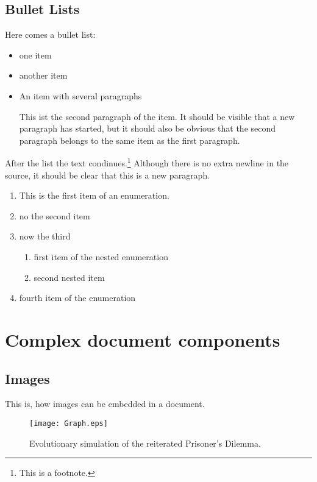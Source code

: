 \documentclass[12pt, english, a4paper]{article}
\begin{document}
\subsection{Bullet Lists}

Here comes a bullet list:
\begin{itemize}
\item one item
\item another item
\item An item with several paragraphs

      This ist the second paragraph of the item. It should be visible that a new
      paragraph has started, but it should also be obvious that the second
      paragraph belongs to the same item as the first paragraph.
\end{itemize}
After the list the text condinues.\footnote{This is a footnote.} Although there is no extra newline in the source,
it should be clear that this is a new paragraph.

\begin{enumerate}
\item This is the first item of an enumeration.
\item no the second item
\item now the third
      \begin{enumerate}
      \item first item of the nested enumeration
      \item second nested item
      \end{enumerate}
\item fourth item of the enumeration
\end{enumerate}


\section{Complex document components}

\subsection{Images}

 This is, how images can be embedded in a document.

\begin{figure}
\begin{center}
\texttt{[image: Graph.eps]}
\caption{\label{Graph} Evolutionary simulation of the reiterated Prisoner's Dilemma.}
\end{center}
\end{figure}
\end{document}
